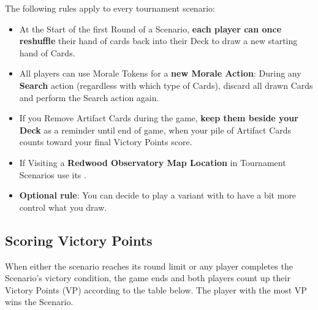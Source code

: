 \begin{multicols*}{2}
The following rules apply to every tournament scenario:
\begin{itemize}
    \item At the Start of the first Round of a Scenario, \textbf{each player can once reshuffle} their hand of cards back into their Deck to draw a new starting hand of Cards.
    \item All players can use Morale Tokens for a \textbf{new Morale Action}: During any \textbf{Search} action (regardless with which type of Cards), discard all drawn Cards and perform the Search action again.
    \item If you Remove Artifact Cards during the game, \textbf{keep them beside your Deck} as a reminder until end of game, when your pile of Artifact Cards counts toward your final Victory Points score.
    \item If Visiting a \textbf{Redwood Observatory Map Location} in Tournament Scenarios use its .
    \item \textbf{Optional rule}: You can decide to play a variant with  to have a bit more control what you draw.
\end{itemize}

\subsection*{Scoring Victory Points}
When either the scenario reaches its round limit or any player completes the Scenario's victory condition, the game ends and both players count up their Victory Points (VP) according to the table below.
The player with the most VP wins the Scenario.

\vspace*{\fill}
\columnbreak

\end{multicols*}
